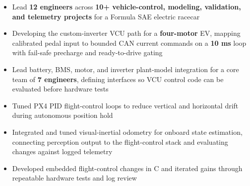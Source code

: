 \documentclass[10pt,letterpaper]{article}
\renewcommand{\entryspace}{\vspace{0pt}}
\begin{document}
\bodyfont

\resumeheader
\educationsection




\orgline{\spartanracing}
\begin{itemize}
  \item Lead \textbf{12 engineers} across \textbf{10+ vehicle-control, modeling, validation, and telemetry projects} for a Formula SAE electric racecar
  \item Developing the custom-inverter VCU path for a \textbf{four-motor} EV, mapping calibrated pedal input to bounded CAN current commands on a \textbf{10 ms} loop with fail-safe precharge and ready-to-drive gating
  \item Lead battery, BMS, motor, and inverter plant-model integration for a core team of \textbf{7 engineers}, defining interfaces so VCU control code can be evaluated before hardware tests
\end{itemize}

\entryspace

\begin{itemize}
  \item Tuned PX4 PID flight-control loops to reduce vertical and horizontal drift during autonomous position hold
  \item Integrated and tuned visual-inertial odometry for onboard state estimation, connecting perception output to the flight-control stack and evaluating changes against logged telemetry
  \item Developed embedded flight-control changes in C and iterated gains through repeatable hardware tests and log review
\end{itemize}

\entryspace
\end{document}
